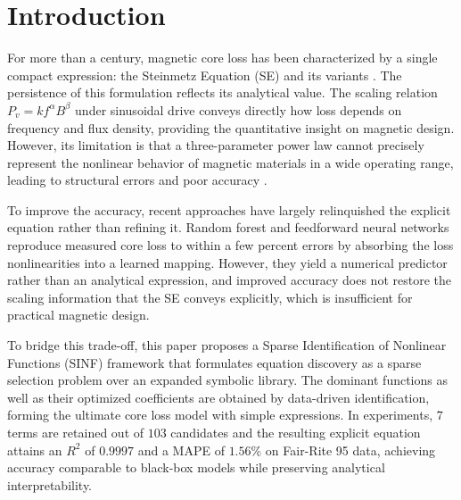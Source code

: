 \section{Introduction}\label{sec:Intro}
For more than a century, magnetic core loss has been characterized by a single compact expression: the Steinmetz Equation (SE) and its variants \cite{1457110, 5955126}. The persistence of this formulation reflects its analytical value. The scaling relation $P_v=k f^\alpha B^\beta$ under sinusoidal drive conveys directly how loss depends on frequency and flux density, providing the quantitative insight on magnetic design. However, its limitation is that a three-parameter power law cannot precisely represent the nonlinear behavior of magnetic materials in a wide operating range, leading to structural errors and poor accuracy \cite{7370781}. 

To improve the accuracy, recent approaches have largely relinquished the explicit equation rather than refining it. Random forest \cite{10509368} and feedforward neural networks \cite{10502151} reproduce measured core loss to within a few percent errors by absorbing the loss nonlinearities into a learned mapping. However, they yield a numerical predictor rather than an analytical expression, and improved accuracy does not restore the scaling information that the SE conveys explicitly, which is insufficient for practical magnetic design. 

To bridge this trade-off, this paper proposes a Sparse Identification of Nonlinear Functions (SINF) framework that formulates equation discovery as a sparse selection problem over an expanded symbolic library. The dominant functions as well as their optimized coefficients are obtained by data-driven identification, forming the ultimate core loss model with simple expressions. In experiments, $7$ terms are retained out of $103$ candidates and the resulting explicit equation attains an $R^2$ of $0.9997$ and a MAPE of $1.56\%$ on Fair-Rite 95 data, achieving accuracy comparable to black-box models while preserving analytical interpretability.